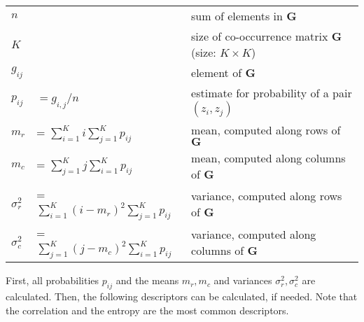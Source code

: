 \begin{table}[h]
	\begin{tabular}{lll}
		$n$	& & sum of elements in $\mathbf{G}$ \\
		$K$ & & size of co-occurrence matrix $\mathbf{G}$ (size: $K \times K$) \\
		$g_{ij}$ & & element of $\mathbf{G}$ \\
		$p_{ij}$ & $= g_{i,j} / n$ & estimate for probability of a pair $(z_i,z_j)$ \\
		$m_r$ &= $\sum\limits_{i=1}^{K} i \sum\limits_{j=1}^{K} p_{ij}$ & mean, computed along rows of $\mathbf{G}$ \\
		$m_c$ &= $\sum\limits_{j=1}^{K} j \sum\limits_{i=1}^{K} p_{ij}$ & mean, computed along columns of $\mathbf{G}$ \\
		$\sigma_r^2$ &= $\sum\limits_{i=1}^{K} (i-m_r)^2 \sum\limits_{j=1}^{K} p_{ij}$ & variance, computed along rows of $\mathbf{G}$ \\
		$\sigma_c^2$ &= $\sum\limits_{j=1}^{K} (j-m_c)^2 \sum\limits_{i=1}^{K} p_{ij}$ & variance, computed along columns of $\mathbf{G}$ \\
	\end{tabular}
\end{table}

First, all probabilities $p_{ij}$ and the means $m_r, m_c$ and variances $\sigma_r^2,\sigma_c^2$ are calculated.
Then, the following descriptors can be calculated, if needed. Note that the correlation and the entropy are the most common descriptors.

